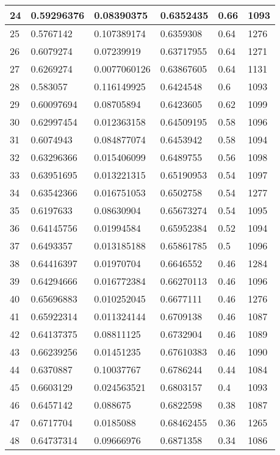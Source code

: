 \begin{longtable}{|l|l|l|l|l|l|}
24 & 0.59296376 & 0.08390375 & 0.6352435 & 0.66 & 1093 \\ \hline 
25 & 0.5767142 & 0.107389174 & 0.6359308 & 0.64 & 1276 \\ \hline 
26 & 0.6079274 & 0.07239919 & 0.63717955 & 0.64 & 1271 \\ \hline 
27 & 0.6269274 & 0.0077060126 & 0.63867605 & 0.64 & 1131 \\ \hline 
28 & 0.583057 & 0.116149925 & 0.6424548 & 0.6 & 1093 \\ \hline 
29 & 0.60097694 & 0.08705894 & 0.6423605 & 0.62 & 1099 \\ \hline 
30 & 0.62997454 & 0.012363158 & 0.64509195 & 0.58 & 1096 \\ \hline 
31 & 0.6074943 & 0.084877074 & 0.6453942 & 0.58 & 1094 \\ \hline 
32 & 0.63296366 & 0.015406099 & 0.6489755 & 0.56 & 1098 \\ \hline 
33 & 0.63951695 & 0.013221315 & 0.65190953 & 0.54 & 1097 \\ \hline 
34 & 0.63542366 & 0.016751053 & 0.6502758 & 0.54 & 1277 \\ \hline 
35 & 0.6197633 & 0.08630904 & 0.65673274 & 0.54 & 1095 \\ \hline 
36 & 0.64145756 & 0.01994584 & 0.65952384 & 0.52 & 1094 \\ \hline 
37 & 0.6493357 & 0.013185188 & 0.65861785 & 0.5 & 1096 \\ \hline 
38 & 0.64416397 & 0.01970704 & 0.6646552 & 0.46 & 1284 \\ \hline 
39 & 0.64294666 & 0.016772384 & 0.66270113 & 0.46 & 1096 \\ \hline 
40 & 0.65696883 & 0.010252045 & 0.6677111 & 0.46 & 1276 \\ \hline 
41 & 0.65922314 & 0.011324144 & 0.6709138 & 0.46 & 1087 \\ \hline 
42 & 0.64137375 & 0.08811125 & 0.6732904 & 0.46 & 1089 \\ \hline 
43 & 0.66239256 & 0.01451235 & 0.67610383 & 0.46 & 1090 \\ \hline 
44 & 0.6370887 & 0.10037767 & 0.6786244 & 0.44 & 1084 \\ \hline 
45 & 0.6603129 & 0.024563521 & 0.6803157 & 0.4 & 1093 \\ \hline 
46 & 0.6457142 & 0.088675 & 0.6822598 & 0.38 & 1087 \\ \hline 
47 & 0.6717704 & 0.0185088 & 0.68462455 & 0.36 & 1265 \\ \hline 
48 & 0.64737314 & 0.09666976 & 0.6871358 & 0.34 & 1086 \\ \hline 

\end{longtable}
